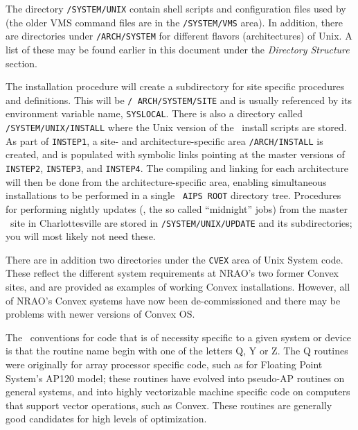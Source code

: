 The directory {\tt \thisver/SYSTEM/UNIX} contain shell scripts and
configuration files used by \AIPS (the older VMS command files are in the
{\tt\thisver/SYS\-TEM/VMS} area).  In addition, there are directories
under {\tt\thisver/\dol ARCH/SYSTEM} for different flavors (architectures)
of Unix.  A list of these may be found earlier in this document under the
{\it Directory Structure\/} section.

The installation procedure will create a subdirectory for site specific
procedures and definitions.  This will be {\tt \thisver/\dol
ARCH/SYSTEM/\dol SITE} and is usually referenced by its environment
variable name, {\tt\dol SYSLOCAL}.  There is also a directory called {\tt
\thisver/SYSTEM/UNIX/INSTALL} where the Unix version of the \AIPS\ install
scripts are stored.  As part of {\tt INSTEP1}, a site- and
architecture-specific area {\tt\thisver/\dol ARCH/INSTALL} is created, and
is populated with symbolic links pointing at the master versions of {\tt
INSTEP2}, {\tt INSTEP3}, and {\tt INSTEP4}.  The compiling and linking for
each architecture will then be done from the architecture-specific area,
enabling simultaneous installations to be performed in a single {\tt
AIPS ROOT} directory tree.  Procedures for performing nightly
updates (\ie, the so called ``midnight'' jobs) from the master \AIPS\ site
in Charlottesville are stored in {\tt \thisver/SYSTEM/UNIX/UPDATE} and its
subdirectories; you will most likely not need these.

There are in addition two directories under the {\tt CVEX} area of Unix
System code.  These reflect the different system requirements at NRAO's
two former Convex sites, and are provided as examples of working Convex
installations.  However, all of NRAO's  Convex systems have now been
de-commissioned and there may be problems with newer versions of
Convex OS.

\medskip{}

The \AIPS\ conventions for code that is of necessity specific to a
given system or device is that the routine name begin with one of the
letters Q, Y or Z.  The Q routines were originally for array processor
specific code, such as for Floating Point System's AP120 model; these
routines have evolved into pseudo-AP routines on general systems, and
into highly vectorizable machine specific code on computers that
support vector operations, such as Convex.  These routines are generally
good candidates for high levels of optimization.

